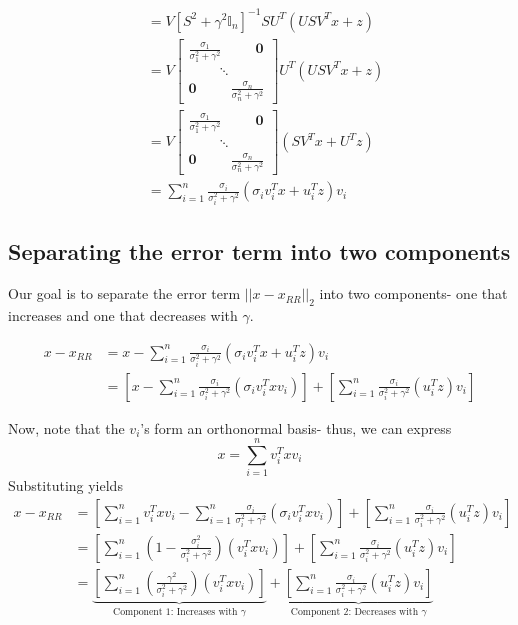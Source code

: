 \documentclass[paper=a4, fontsize=11pt]{scrartcl} %
\numberwithin{equation}{section} %
\numberwithin{figure}{section} %
\numberwithin{table}{section} %
\begin{document}
\begin{align*}
   &= V \left[S^2 + \gamma^2 \mathbb{I}_n\right]^{-1} SU^T(USV^Tx+z) \\
   &= V \left[\begin{matrix}
\frac{\sigma_1}{\sigma_1^2 + \gamma^2} \ \qquad{} \  \bm{0}  \\
\qquad{} \ \ddots \ \qquad{} \\
 \bm{0}  \ \qquad{}  \ \frac{\sigma_n}{\sigma_n^2 + \gamma^2}
 \end{matrix}\right]U^T(USV^Tx+z)\\
    &= V \left[\begin{matrix}
\frac{\sigma_1}{\sigma_1^2 + \gamma^2} \ \qquad{} \  \bm{0}  \\
\qquad{} \ \ddots \ \qquad{} \\
 \bm{0}  \ \qquad{}  \ \frac{\sigma_n}{\sigma_n^2 + \gamma^2}
 \end{matrix}\right](SV^Tx+U^Tz) \\
        &=  \sum_{i=1}^n \frac{\sigma_i}{\sigma_i^2 + \gamma^2}(\sigma_i v_i^T x + u_i^T z)v_i
\end{align*}

\subsection{Separating the error term into two components}

Our goal is to separate the error term $||x - x_{RR}||_2$ into two components- one that increases and one that decreases with $\gamma$.

\begin{align*}
x - x_{RR} &= x - \sum_{i=1}^n \frac{\sigma_i}{\sigma_i^2 + \gamma^2}(\sigma_i v_i^T x + u_i^T z)v_i \\
   &= \left[ x - \sum_{i=1}^n \frac{\sigma_i}{\sigma_i^2 + \gamma^2}(\sigma_i v_i^T x v_i )\right]+ \left[\sum_{i=1}^n \frac{\sigma_i}{\sigma_i^2 + \gamma^2}(u_i^T z)v_i \right]
\end{align*}

Now, note that the $v_i$'s form an orthonormal basis- thus, we can express
\[x = \sum_{i=1}^n v_i^T x v_i\]
Substituting yields
\begin{align*}
x - x_{RR} &= \left[ \sum_{i=1}^n v_i^T x v_i - \sum_{i=1}^n \frac{\sigma_i}{\sigma_i^2 + \gamma^2}(\sigma_i v_i^T x v_i )\right]+ \left[\sum_{i=1}^n \frac{\sigma_i}{\sigma_i^2 + \gamma^2}(u_i^T z)v_i \right] \\
   &=\left[ \sum_{i=1}^n \left(1 - \frac{\sigma_i^2}{\sigma_i^2 + \gamma^2}\right) (v_i^T x v_i )\right]+ \left[\sum_{i=1}^n \frac{\sigma_i}{\sigma_i^2 + \gamma^2}(u_i^T z)v_i \right] \\
   &=\underbrace{\left[ \sum_{i=1}^n \left( \frac{\gamma^2}{\sigma_i^2 + \gamma^2}\right) (v_i^T x v_i )\right]}_{\text{Component 1: Increases with $\gamma$}}+ \underbrace{\left[\sum_{i=1}^n \frac{\sigma_i}{\sigma_i^2 + \gamma^2}(u_i^T z)v_i \right]}_{\text{Component 2: Decreases with $\gamma$}}
\end{align*}
\end{document}
